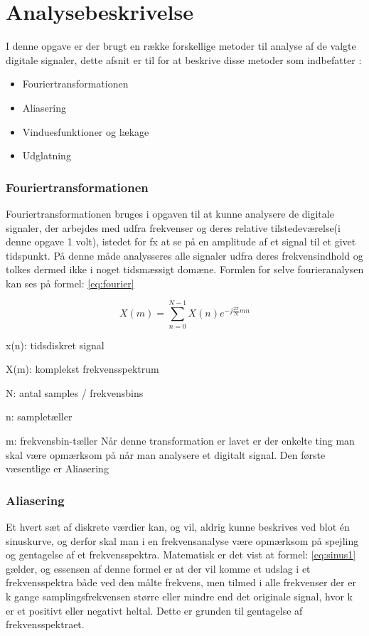\chapter{Analysebeskrivelse}\label{ch:analysebeskrivelse}

I denne opgave er der brugt en række forskellige metoder til analyse af de valgte digitale signaler, dette afsnit er til for at beskrive disse metoder som indbefatter :
\begin{itemize}
\item Fouriertransformationen
\item Aliasering
\item Vinduesfunktioner og lækage
\item Udglatning
\end{itemize}
 
 
 
\subsection{Fouriertransformationen}

Fouriertransformationen bruges i opgaven til at kunne analysere de digitale signaler, der arbejdes med udfra frekvenser og deres relative tilstedeværelse(i denne opgave 1 volt), istedet for fx at se på en amplitude af et signal til et givet tidspunkt. På denne måde analysseres alle signaler udfra deres frekvensindhold og tolkes dermed ikke i noget tidsmæssigt domæne. Formlen for selve fourieranalysen kan ses på formel: \eqref{eq:fourier}

\begin{equation}\label{eq:fourier}
	{X(m)} = \displaystyle\sum_{n=0}^{N-1} {X(n)e^{-j\frac{2\pi}{N}mn}}
\end{equation}

x(n): tidsdiskret signal

X(m): komplekst frekvensspektrum

N: antal samples / frekvensbins

n: sampletæller

m: frekvensbin-tæller
\newline
\newline
 Når denne transformation er lavet er der enkelte ting man skal være opmærksom på når man analysere et digitalt signal. Den første væsentlige er Aliasering 


\subsection{Aliasering}
Et hvert sæt af diskrete værdier kan, og vil, aldrig kunne beskrives ved blot én sinuskurve, og derfor skal man i en frekvensanalyse være opmærksom på spejling og gentagelse af et frekvensspektra. Matematisk er det vist at formel: \eqref{eq:sinus1} gælder, og essensen af denne formel er at der vil komme et udslag i et frekvensspektra både ved den målte frekvens, men tilmed i alle frekvenser der er k gange samplingsfrekvensen større eller mindre end det originale signal, hvor k er et positivt eller negativt heltal. Dette er grunden til gentagelse af frekvensspektraet. 


